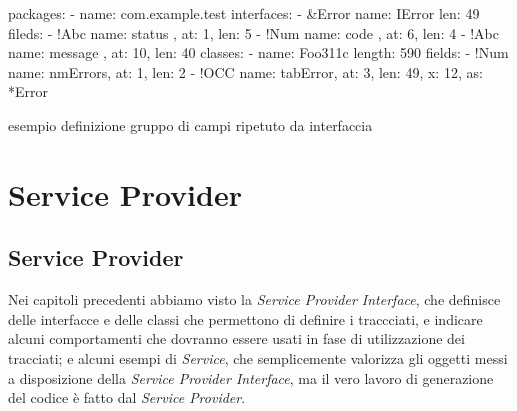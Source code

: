 \documentclass[a4paper,10pt]{report}
\newif\ifesource
\newenvironment{elisting}[1][H]
  {\captionsetup{aboveskip=0pt}\begin{listing}[#1]}
  {\end{listing}%
}
\begin{document}
\ifesource
\begin{figure*}[!htb]
\begin{lstlisting}[language=yaml, 
caption={esempio definizione gruppo di campi ripetuto da interfaccia}, 
label=lst:xmplIOcc]
packages:
  - name: com.example.test
    interfaces:
      - &Error
        name: IError
        len: 49
        fields:
          - !Abc { name: status  , at:  1, len:  5 }
          - !Num { name: code    , at:  6, len:  4 }
          - !Abc { name: message , at: 10, len: 40 }
    classes:
      - name: Foo311c
        length: 590
        fields:
          - !Num { name: nmErrors, at: 1, len: 2}
          - !OCC { name: tabError, at: 3, len: 49, x: 12, as: *Error }
\end{lstlisting}
\end{figure*}
\else
\begin{elisting}[!htb]
\begin{yamlcode}
packages:
  - name: com.example.test
    interfaces:
      - &Error
        name: IError
        len: 49
        fileds:
          - !Abc { name: status  , at:  1, len:  5}
          - !Num { name: code    , at:  6, len:  4}
          - !Abc { name: message , at: 10, len: 40}
    classes:
      - name: Foo311c
        length: 590
        fields:
          - !Num { name: nmErrors, at: 1, len: 2}
          - !OCC { name: tabError, at: 3, len: 49, x: 12, as: *Error }
\end{yamlcode}
\caption{esempio definizione gruppo di campi ripetuto da interfaccia}
\label{lst:xmplIOcc}
\end{elisting}
\fi

\part{Service Provider}


\chapter{Service Provider}
Nei capitoli precedenti abbiamo visto la \textsl{Service Provider Interface}, 
che  definisce delle interfacce e delle classi che permettono di definire i 
traccciati, e indicare alcuni comportamenti che dovranno essere usati in fase di
utilizzazione dei tracciati; e alcuni esempi di \textsl{Service}, che
semplicemente valorizza gli oggetti messi a disposizione della 
\textsl{Service Provider Interface}, ma il vero lavoro di generazione del codice 
è fatto dal \textsl{Service Provider}.
\end{document}
